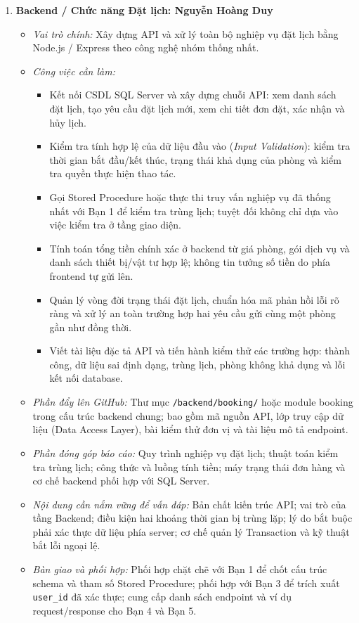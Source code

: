 \begin{enumerate}[leftmargin=1.5em]
    \item \textbf{Backend / Chức năng Đặt lịch: Nguyễn Hoàng Duy}
    \begin{itemize}[leftmargin=1.2em]
        \item \textit{Vai trò chính:} Xây dựng API và xử lý toàn bộ nghiệp vụ đặt lịch bằng Node.js / Express theo công nghệ nhóm thống nhất.
        \item \textit{Công việc cần làm:}
        \begin{itemize}[label={--}]
            \item Kết nối CSDL SQL Server và xây dựng chuỗi API: xem danh sách đặt lịch, tạo yêu cầu đặt lịch mới, xem chi tiết đơn đặt, xác nhận và hủy lịch.
            \item Kiểm tra tính hợp lệ của dữ liệu đầu vào (\textit{Input Validation}): kiểm tra thời gian bắt đầu/kết thúc, trạng thái khả dụng của phòng và kiểm tra quyền thực hiện thao tác.
            \item Gọi Stored Procedure hoặc thực thi truy vấn nghiệp vụ đã thống nhất với Bạn 1 để kiểm tra trùng lịch; tuyệt đối không chỉ dựa vào việc kiểm tra ở tầng giao diện.
            \item Tính toán tổng tiền chính xác ở backend từ giá phòng, gói dịch vụ và danh sách thiết bị/vật tư hợp lệ; không tin tưởng số tiền do phía frontend tự gửi lên.
            \item Quản lý vòng đời trạng thái đặt lịch, chuẩn hóa mã phản hồi lỗi rõ ràng và xử lý an toàn trường hợp hai yêu cầu gửi cùng một phòng gần như đồng thời.
            \item Viết tài liệu đặc tả API và tiến hành kiểm thử các trường hợp: thành công, dữ liệu sai định dạng, trùng lịch, phòng không khả dụng và lỗi kết nối database.
        \end{itemize}
        \item \textit{Phần đẩy lên GitHub:} Thư mục \texttt{/backend/booking/} hoặc module booking trong cấu trúc backend chung; bao gồm mã nguồn API, lớp truy cập dữ liệu (Data Access Layer), bài kiểm thử đơn vị và tài liệu mô tả endpoint.
        \item \textit{Phần đóng góp báo cáo:} Quy trình nghiệp vụ đặt lịch; thuật toán kiểm tra trùng lịch; công thức và luồng tính tiền; máy trạng thái đơn hàng và cơ chế backend phối hợp với SQL Server.
        \item \textit{Nội dung cần nắm vững để vấn đáp:} Bản chất kiến trúc API; vai trò của tầng Backend; điều kiện hai khoảng thời gian bị trùng lặp; lý do bắt buộc phải xác thực dữ liệu phía server; cơ chế quản lý Transaction và kỹ thuật bắt lỗi ngoại lệ.
        \item \textit{Bàn giao và phối hợp:} Phối hợp chặt chẽ với Bạn 1 để chốt cấu trúc schema và tham số Stored Procedure; phối hợp với Bạn 3 để trích xuất \texttt{user\_id} đã xác thực; cung cấp danh sách endpoint và ví dụ request/response cho Bạn 4 và Bạn 5.
    \end{itemize}


\end{enumerate}
